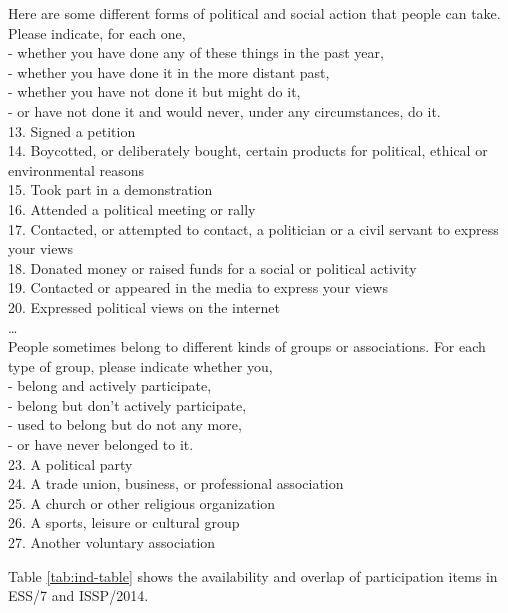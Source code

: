 \documentclass[12pt,]{article}
\begin{document}
Here are some different forms of political and social action that people can take. Please indicate, for each one,\\
- whether you have done any of these things in the past year,\\
- whether you have done it in the more distant past,\\
- whether you have not done it but might do it,\\
- or have not done it and would never, under any circumstances, do it.\\
13. Signed a petition\\
14. Boycotted, or deliberately bought, certain products for political, ethical or environmental reasons\\
15. Took part in a demonstration\\
16. Attended a political meeting or rally\\
17. Contacted, or attempted to contact, a politician or a civil servant to express your views\\
18. Donated money or raised funds for a social or political activity\\
19. Contacted or appeared in the media to express your views\\
20. Expressed political views on the internet\\
\ldots{}\\
People sometimes belong to different kinds of groups or associations. For each type of group, please indicate whether you,\\
- belong and actively participate,\\
- belong but don't actively participate,\\
- used to belong but do not any more,\\
- or have never belonged to it.\\
23. A political party\\
24. A trade union, business, or professional association\\
25. A church or other religious organization\\
26. A sports, leisure or cultural group\\
27. Another voluntary association

Table \ref{tab:ind-table} shows the availability and overlap of participation items in ESS/7 and ISSP/2014.
\end{document}
